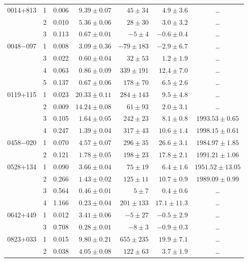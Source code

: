 \begin{table}[tbh!]
\begin{SingleSpace}
\begin{tabular}{l c r r r r c}
0014+813 &  1 &  0.006 & $ 9.39\pm 0.07$ & $  45\pm  34$ & $  4.9\pm 3.6$ & \dots \\
         &  2 &  0.010 & $ 5.36\pm 0.06$ & $  28\pm  30$ & $  3.0\pm 3.2$ & \dots \\
         &  3 &  0.113 & $ 0.67\pm 0.01$ & $  -5\pm   4$ & $ -0.6\pm 0.4$ & \dots \\
0048$-$097 &  1 &  0.008 & $ 3.09\pm 0.36$ & $ -79\pm 183$ & $ -2.9\pm 6.7$ & \dots \\
         &  3 &  0.022 & $ 0.60\pm 0.04$ & $  32\pm  53$ & $  1.2\pm 1.9$ & \dots \\
         &  4 &  0.063 & $ 0.86\pm 0.09$ & $ 339\pm 191$ & $ 12.4\pm 7.0$ & \dots \\
         &  5 &  0.137 & $ 0.67\pm 0.06$ & $ 178\pm  70$ & $  6.5\pm 2.6$ & \dots \\
0119+115 &  1 &  0.023 & $20.33\pm 0.11$ & $ 284\pm 143$ & $  9.5\pm 4.8$ & \dots \\
         &  2 &  0.009 & $14.24\pm 0.08$ & $  61\pm  93$ & $  2.0\pm 3.1$ & \dots \\
         &  3 &  0.105 & $ 1.64\pm 0.05$ & $ 242\pm  23$ & $  8.1\pm 0.8$ & $1993.53\pm   0.65$ \\
         &  4 &  0.247 & $ 1.39\pm 0.04$ & $ 317\pm  43$ & $ 10.6\pm 1.4$ & $1998.15\pm   0.61$ \\
0458$-$020 &  1 &  0.070 & $ 4.57\pm 0.07$ & $ 296\pm  35$ & $ 26.6\pm 3.1$ & $1984.97\pm   1.85$ \\
         &  2 &  0.121 & $ 1.78\pm 0.05$ & $ 198\pm  23$ & $ 17.8\pm 2.1$ & $1991.21\pm   1.06$ \\
0528+134 &  1 &  0.090 & $ 3.66\pm 0.04$ & $  75\pm  19$ & $  6.4\pm 1.6$ & $1951.52\pm  13.05$ \\
         &  2 &  0.266 & $ 1.43\pm 0.02$ & $ 125\pm  11$ & $ 10.7\pm 0.9$ & $1989.09\pm   0.99$ \\
         &  3 &  0.564 & $ 0.46\pm 0.01$ & $   5\pm   7$ & $  0.4\pm 0.6$ & \dots \\
         &  4 &  1.166 & $ 0.23\pm 0.04$ & $ 201\pm 133$ & $ 17.1\pm11.3$ & \dots \\
0642+449 &  1 &  0.012 & $ 3.41\pm 0.06$ & $  -5\pm  27$ & $ -0.5\pm 2.9$ & \dots \\
         &  3 &  0.708 & $ 0.28\pm 0.01$ & $  -8\pm   3$ & $ -0.9\pm 0.3$ & \dots \\
0823+033 &  1 &  0.015 & $ 9.80\pm 0.21$ & $ 655\pm 235$ & $ 19.9\pm 7.1$ & \dots \\
         &  2 &  0.038 & $ 4.05\pm 0.08$ & $ 122\pm  63$ & $  3.7\pm 1.9$ & \dots \\

\end{tabular}
\end{SingleSpace}
\end{table}
